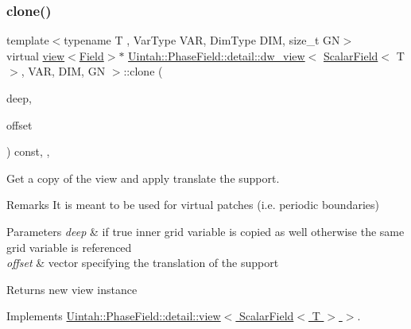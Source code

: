 \subsubsection{\texorpdfstring{clone()}{clone()}\hspace{0.1cm}{\footnotesize\ttfamily [2/2]}}
{\footnotesize\ttfamily template$<$typename T , Var\+Type V\+AR, Dim\+Type D\+IM, size\+\_\+t GN$>$ \\
virtual \hyperlink{classUintah_1_1PhaseField_1_1detail_1_1view}{view}$<$\hyperlink{structUintah_1_1PhaseField_1_1ScalarField}{Field}$>$$\ast$ \hyperlink{classUintah_1_1PhaseField_1_1detail_1_1dw__view}{Uintah\+::\+Phase\+Field\+::detail\+::dw\+\_\+view}$<$ \hyperlink{structUintah_1_1PhaseField_1_1ScalarField}{Scalar\+Field}$<$ T $>$, V\+AR, D\+IM, GN $>$\+::clone (\begin{DoxyParamCaption}\item[{bool}]{deep,  }\item[{const Int\+Vector \&}]{offset }\end{DoxyParamCaption}) const\hspace{0.3cm}{\ttfamily [inline]}, {\ttfamily [override]}, {\ttfamily [virtual]}}



Get a copy of the view and apply translate the support. 

\begin{DoxyRemark}{Remarks}
It is meant to be used for virtual patches (i.\+e. periodic boundaries)
\end{DoxyRemark}

\begin{DoxyParams}{Parameters}
{\em deep} & if true inner grid variable is copied as well otherwise the same grid variable is referenced \\
\hline
{\em offset} & vector specifying the translation of the support \\
\hline
\end{DoxyParams}
\begin{DoxyReturn}{Returns}
new view instance 
\end{DoxyReturn}


Implements \hyperlink{classUintah_1_1PhaseField_1_1detail_1_1view_3_01ScalarField_3_01T_01_4_01_4_abd928104240e329f3bc4441ebab7c50c}{Uintah\+::\+Phase\+Field\+::detail\+::view$<$ Scalar\+Field$<$ T $>$ $>$}.

\mbox{\label{classUintah_1_1PhaseField_1_1detail_1_1dw__view_3_01ScalarField_3_01T_01_4_00_01VAR_00_01DIM_00_01GN_01_4_a318a539e7857de7ba1271e7bb0ac9437}} 
